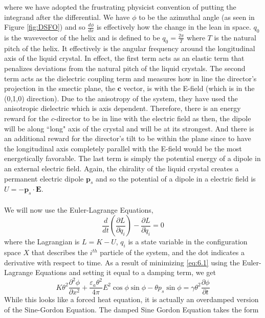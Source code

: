 \documentclass{article}
\newcommand{\pd}[2]{\frac{\partial #1}{\partial #2}}
\newcommand{\od}[2]{\frac{d #1}{d #2}}
\newcommand{\pdt}[2]{\frac{\partial ^2 #1}{\partial #2 ^2}}
\newcommand{\vb}[1]{\mathbf{ #1}}
\numberwithin{equation}{section}
\begin{document}
where we have adopted the frustrating physicist convention of putting the integrand after the differential. We have $\phi$ to be the azimuthal angle (as seen in Figure \ref{fig:DSFO}) and so $\od{\phi}{x}$ is effectively how the change in the lean in space. $q_0$ is the wavevector of the helix and is defined to be $q_0 = \frac{2\pi}{T}$ where $T$ is the natural pitch of the helix. It effectively is the angular frequency around the longitudinal axis of the liquid crystal. In effect, the first term acts as an elastic term that penalizes deviations from the natural pitch of the liquid crystals. The second term acts as the dielectric coupling term and measures how in line the director's projection in the smectic plane, the $\vb{c}$ vector, is with the E-field (which is in the (0,1,0) direction). Due to the anisotropy of the system, they have used the anisotropic dielectric which is axis dependent. Therefore, there is an energy reward for the $c$-director to be in line with the electric field as then, the dipole will be along ``long" axis of the crystal and will be at its strongest. And there is an additional reward for the director's tilt to be within the plane since to have the longitudinal axis completely parallel with the E-field would be the most energetically favorable. The last term is simply the potential energy of a dipole in an external electric field. Again, the chirality of the liquid crystal creates a permanent electric dipole $\vb{p}_s$ and so the potential of a dipole in a electric field is $U = -\vb{p}_s \cdot\vb{E}$.\\\\
We will now use the Euler-Lagrange Equations,
\begin{equation}
    \od{}{t}\left(\pd{L}{q_i} \right) - \pd{L}{\dot{q}_i} = 0
\end{equation}
where the Lagrangian is $L=K-U$, $q_i$ is a state variable in the configuration space $X$ that describes the $i^{th}$ particle of the system, and the dot indicates a derivative with respect to time. As a result of minimizing \eqref{eq:6.1} using the Euler-Lagrange Equations and setting it equal to a damping term, we get 
\begin{equation}
    K\theta^2 \pdt{\phi}{x} + \frac{\varepsilon_a \theta^2}{4\pi}E^2\cos \phi \sin \phi - \theta p_s \sin \phi = \gamma \theta^2 \pd{\phi}{t} \label{eq:6.3}
\end{equation}
While this looks like a forced heat equation, it is actually an overdamped version of the Sine-Gordon Equation. The damped Sine Gordon Equation takes the form 
\end{document}
